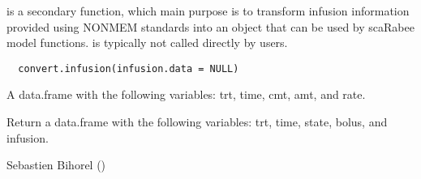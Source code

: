 %
\begin{Description}\relax
{} is a secondary function, which main purpose is to
transform infusion information provided using NONMEM standards into an object
that can be used by scaRabee model functions.  is 
typically not called directly by users.
\end{Description}
%
\begin{Usage}
\begin{verbatim}
  convert.infusion(infusion.data = NULL)
\end{verbatim}
\end{Usage}
%
\begin{Arguments}
\begin{ldescription}
\item[\code{infusion.data}] A data.frame with the following variables: trt, time, 
cmt, amt, and rate.
\end{ldescription}
\end{Arguments}
%
\begin{Value}
Return a data.frame with the following variables: trt, time, state,  bolus, 
and infusion.
\end{Value}
%
\begin{Author}\relax
Sebastien Bihorel ()
\end{Author}
%
\begin{SeeAlso}\relax
{}
\end{SeeAlso}
